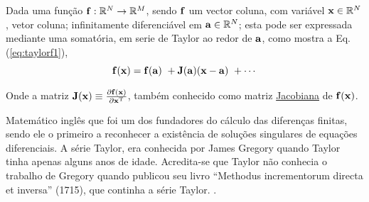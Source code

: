 \begin{proposition}\label{prop:taylorf}
Dada uma função  $\VECTOR{f}:\mathbb{R}^{N}\rightarrow \mathbb{R}^{M}$, 
sendo $\VECTOR{f}$ um vector coluna, com variável $\VECTOR{x} \in \mathbb{R}^{N}$, vetor coluna;
infinitamente diferenciável em $\VECTOR{a} \in \mathbb{R}^{N}$;
esta pode ser expressada mediante uma somatória, em serie de Taylor 
\cite[pp. 393]{levine1999control} \cite{Taylor} ao redor de $\VECTOR{a}$, como
mostra a Eq. (\ref{eq:taylorf1}),
\begin{equation}\label{eq:taylorf1}
\VECTOR{f}(\VECTOR{x}) =\VECTOR{f}(\VECTOR{a})
      ~+ \MATRIX{J}(\VECTOR{a}) (\VECTOR{x}-\VECTOR{a})
      ~+\cdots 
\end{equation}

Onde a matriz $\MATRIX{J}(\VECTOR{x})\equiv \frac{\partial \VECTOR{f}(\VECTOR{x})}{\partial \VECTOR{x}^{\transpose} }$,
também conhecido como matriz \hyperref[def:jacobian]{Jacobiana} de $\VECTOR{f}(\VECTOR{x})$.
\end{proposition}


\begin{elaboracion}[title=Brook Taylor (1685-1731), width= 0.99\linewidth]
Matemático inglês que foi um dos fundadores do cálculo das diferenças finitas,
sendo ele o primeiro a reconhecer a existência de soluções singulares de equações diferenciais.
A série Taylor, era conhecida por James Gregory quando Taylor tinha apenas alguns anos de idade. 
Acredita-se que Taylor não conhecia o trabalho de Gregory quando publicou seu livro ``Methodus incrementorum directa et inversa'' (1715),
que continha a série Taylor. 
\cite[pp. 198]{agarwal2014creators}.
\end{elaboracion}
